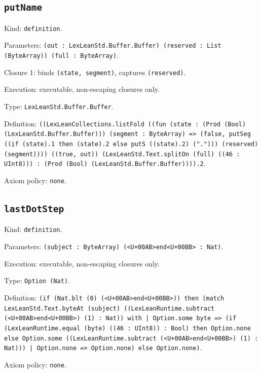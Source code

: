 \documentclass[11pt]{article}
\begin{document}
\subsection*{\texttt{putName}}
\noindent Kind: \texttt{definition}.\par
\noindent Parameters: \texttt{(out : LexLeanStd.Buffer.Buffer) (reserved : List (ByteArray)) (full : ByteArray)}.\par
\noindent Closure 1: binds \texttt{(state, segment)}, captures \texttt{(reserved)}.\par
\noindent Execution: executable, non-escaping closures only.\par
\noindent Type: \texttt{LexLeanStd.Buffer.Buffer}.\par
\noindent Definition: \texttt{((LexLeanCollections.listFold ((fun (state : (Prod (Bool) (LexLeanStd.Buffer.Buffer))) (segment : ByteArray) => (false, putSeg ((if (state).1 then (state).2 else putS ((state).2) ("."))) (reserved) (segment)))) ((true, out)) (LexLeanStd.Text.splitOn (full) ((46 : UInt8))) : (Prod (Bool) (LexLeanStd.Buffer.Buffer)))).2}.\par
\noindent Axiom policy: \texttt{none}.\par
\subsection*{\texttt{lastDotStep}}
\noindent Kind: \texttt{definition}.\par
\noindent Parameters: \texttt{(subject : ByteArray) (<U+00AB>end<U+00BB> : Nat)}.\par
\noindent Execution: executable, non-escaping closures only.\par
\noindent Type: \texttt{Option (Nat)}.\par
\noindent Definition: \texttt{(if (Nat.blt (0) (<U+00AB>end<U+00BB>)) then (match LexLeanStd.Text.byteAt (subject) ((LexLeanRuntime.subtract (<U+00AB>end<U+00BB>) (1) : Nat)) with | Option.some byte => (if (LexLeanRuntime.equal (byte) ((46 : UInt8)) : Bool) then Option.none else Option.some ((LexLeanRuntime.subtract (<U+00AB>end<U+00BB>) (1) : Nat))) | Option.none => Option.none) else Option.none)}.\par
\noindent Axiom policy: \texttt{none}.\par
\end{document}
